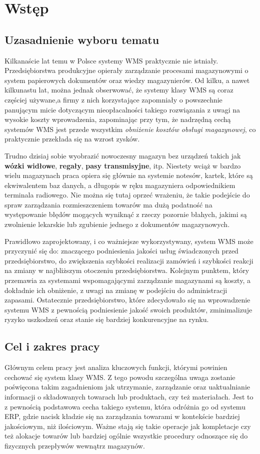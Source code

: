 \chapter{Wstęp}
\label{c1:c1}

\section{Uzasadnienie wyboru tematu}
	Kilkanaście lat temu w Polsce systemy WMS praktycznie nie istniały. Przedsiębiorstwa
	produkcyjne opierały zarządzanie procesami magazynowymi o system papierowych dokumentów
	oraz wiedzy magazynierów. Od kilku, a nawet kilkunastu lat, można jednak obserwować, że
	systemy klasy WMS są coraz częściej używane,a firmy z nich korzystające zapomniały 
	o powszechnie panującym micie dotyczącym nieopłacalności takiego rozwiązania z uwagi na wysokie 
	koszty wprowadzenia, zapominając przy tym, że nadrzędną cechą systemów WMS jest
	przede wszystkim \emph{obniżenie kosztów obsługi magazynowej}, co praktycznie przekłada się na wzrost 
	zysków.
	
	Trudno dzisiaj sobie wyobrazić nowoczesny magazyn bez urządzeń takich jak \textbf{wózki widłowe}, 
	\textbf{regały}, \textbf{pasy transmisyjne}, itp. Niestety wciąż w bardzo wielu magazynach praca 
	opiera się głównie na systemie notesów, kartek, które 
	są ekwiwalentem baz danych, a długopis w ręku magazyniera odpowiednikiem terminala radiowego. Nie 
	można się tutaj oprzeć wrażeniu, że takie podejście do spraw zarządzania rozmieszczeniem towarów
	ma dużą podatność na występowanie błędów mogących wyniknąć z rzeczy pozornie błahych, jakimi są
	zwolnienie lekarskie lub zgubienie jednego z dokumentów magazynowych.
	
	Prawidłowo zaprojektowany, i co ważniejsze wykorzystywany, system WMS może przyczynić się do:
	znaczącego podniesienia jakości usług świadczonych przed przedsiębiorstwo, do zwiększenia
	szybkości realizacji zamówień i szybkości reakcji na zmiany w najbliższym otoczeniu
	przedsiębiorstwa. Kolejnym punktem, który przemawia za systemami wspomagającymi 
	zarządzanie magazynami są koszty, a dokładnie ich obniżenie, z uwagi na zmianę w podejściu 
	do administracji zapasami. Ostatecznie przedsiębiorstwo, które zdecydowało się na wprowadzenie
	systemu WMS z pewnością podniesienie jakość swoich produktów, zminimalizuje ryzyko
	uszkodzeń oraz stanie się bardziej konkurencyjne na rynku.
	\pagebreak	
\section{Cel i zakres pracy}
	Głównym celem pracy jest analiza kluczowych funkcji, którymi powinien cechować
	się system klasy WMS. Z tego powodu szczególna uwaga zostanie poświęcona takim
	zagadnieniom jak utrzymanie, zarządzanie oraz uaktualnianie informacji o 
	składowanych towarach lub produktach, czy też materiałach. Jest to z pewnością
	podstawowa cecha takiego systemu, która odróżnia go od systemu ERP, gdzie nacisk
	kładzie się na zarządzania towarami w kontekście bardziej jakościowym, niż
	ilościowym. Ważne stają się takie operacje jak kompletacje czy też alokacje towarów
	lub bardziej ogólnie wszystkie procedury odnoszące się do fizycznych przepływów
	wewnątrz magazynów.
	 
